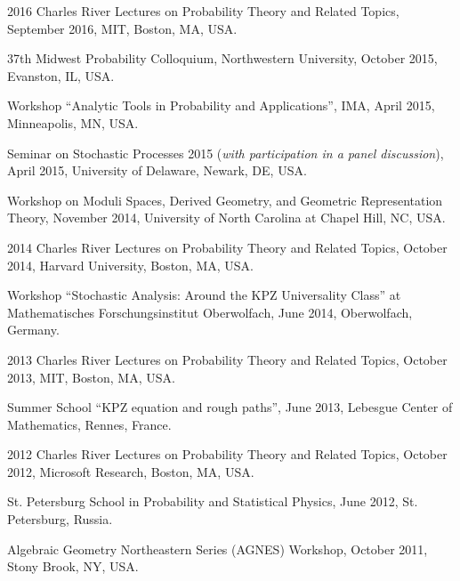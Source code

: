 \documentclass[letterpaper,11pt]{article}
\begin{document}
\begin{etaremune}
\item 
	2016 Charles River Lectures on Probability Theory and Related Topics, 
	September 2016, MIT, Boston, MA, USA.


\item 37th Midwest Probability Colloquium, Northwestern University, 
October 2015,
Evanston, IL, USA.

\item Workshop ``Analytic Tools in Probability and Applications'', IMA, April 2015, Minneapolis, MN, USA.

\item Seminar on Stochastic Processes 2015 (\emph{with participation in a panel discussion}), 
April 2015, University of Delaware, 
Newark, DE, USA.

\item Workshop on Moduli Spaces, Derived Geometry, and Geometric Representation Theory, November 2014, University of North Carolina at Chapel Hill, NC, USA.

\item 2014 Charles River Lectures on Probability Theory and Related Topics, 
October 2014, Harvard University, Boston, MA, USA.

\item Workshop ``Stochastic Analysis: Around the KPZ Universality Class'' at Mathematisches Forschungsinstitut Oberwolfach,
June 2014, Oberwolfach, Germany.

\item 2013 Charles River Lectures on Probability Theory and Related Topics, 
October 2013, MIT, Boston, MA, USA.

\item Summer School ``KPZ equation and rough paths'', 
June 2013, 
Lebesgue Center of Mathematics, Rennes, France.

\item 2012 Charles River Lectures on Probability Theory and Related Topics, 
October 2012, Microsoft Research, Boston, MA, USA.

\item St. Petersburg School in Probability and Statistical Physics, June 2012, St. Petersburg, Russia.

\item Algebraic Geometry Northeastern Series (AGNES) Workshop, 
October 2011,
Stony Brook, NY, USA.


\end{etaremune}
\end{document}

